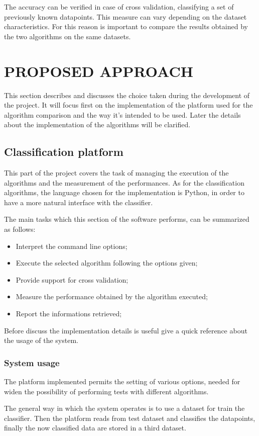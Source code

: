 \documentclass{acm_proc_article-sp-sigmod07}
\begin{document}
The accuracy can be verified in case of cross validation, classifying a
set of previously known datapoints. This measure can vary depending on the
dataset characteristics. For this reason is important to compare the
results obtained by the two algorithms on the same datasets.

\section{PROPOSED APPROACH}
This section describes and discusses the choice taken during the
development of the project. It will focus first on the implementation of
the platform used for the algorithm comparison and the way it's intended
to be used.
Later the details about the implementation of the algorithms will be
clarified.

\subsection{Classification platform}
This part of the project covers the task of managing the execution of the
algorithms and the measurement of the performances. As for the
classification algorithms, the language chosen for the implementation is
Python, in order to have a more natural interface with the classifier.

The main tasks which this section of the software performs, can be
summarized as follows:
\begin{itemize}
\item Interpret the command line options;
\item Execute the selected algorithm following the options given;
\item Provide support for cross validation;
\item Measure the performance obtained by the algorithm executed;
\item Report the informations retrieved;
\end{itemize}

Before discuss the implementation details is useful give a quick reference
about the usage of the system.

\subsubsection{System usage}
The platform implemented permits the setting of various options, needed
for widen the possibility of performing tests with different algorithms.

The general way in which the system operates is to use a dataset for train
the classifier. Then the platform reads from test dataset and classifies
the datapoints, finally the now classified data are stored in a third
dataset.
\end{document}
